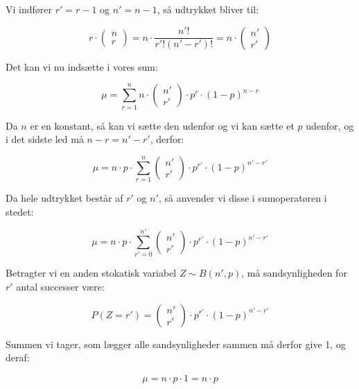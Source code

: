 \begin{proofw}
Vi indfører $r'=r-1$ og $n'=n-1$, så udtrykket bliver til:

$$
r \cdot \begin{pmatrix}
        n \\ r
    \end{pmatrix}
    =
    n \cdot \frac{n'!}{r'!(n'-r')!}
    =
    n \cdot \begin{pmatrix}
        n' \\ r'
    \end{pmatrix}
$$

Det kan vi nu indsætte i vores sum:

$$
\mu =
\sum_{r=1}^{n}  n \cdot \begin{pmatrix}
        n' \\ r'
    \end{pmatrix}
    \cdot p^r \cdot (1-p)^{n-r}
$$

Da $n$ er en konstant, så kan vi sætte den udenfor og vi kan sætte et $p$ udenfor,
og i det sidste led må $n-r=n'-r'$, derfor:

$$
\mu =
n \cdot p \cdot \sum_{r=1}^{n}  \begin{pmatrix}
        n' \\ r'
    \end{pmatrix}
    \cdot p^{r'} \cdot (1-p)^{n'-r'}
$$

Da hele udtrykket består af $r'$ og $n'$, så anvender vi disse i sumoperatøren i stedet:

$$
\mu =
n \cdot p \cdot \sum_{r'=0}^{n'}  \begin{pmatrix}
        n' \\ r'
    \end{pmatrix}
    \cdot p^{r'} \cdot (1-p)^{n'-r'}
$$

Betragter vi en anden stokatisk variabel $Z \sim B(n', p)$,
må sandsynligheden for $r'$ antal successer være:

$$
    P(Z=r')=\begin{pmatrix}
        n' \\ r'
    \end{pmatrix}
    \cdot p^{r'}
    \cdot (1-p)^{n'-r'}
$$

Summen vi tager, som lægger alle sandsynligheder sammen
må derfor give 1, og deraf:

$$
\mu =
n \cdot p \cdot 1=n\cdot p
$$

\end{proofw}
